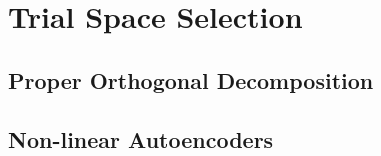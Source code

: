 \section{Trial Space Selection}


\subsection{Proper Orthogonal Decomposition}


\subsection{Non-linear Autoencoders}